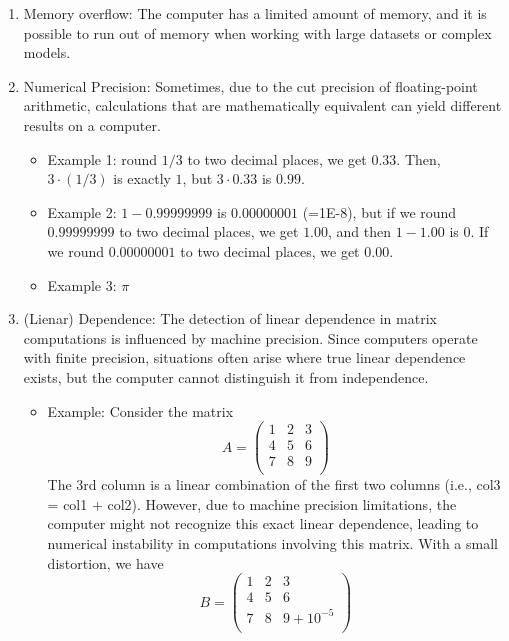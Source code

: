 \documentclass[
  letterpaper,
  DIV=11,
  numbers=noendperiod]{scrreprt}
\providecommand{\tightlist}{%
  \setlength{\itemsep}{0pt}\setlength{\parskip}{0pt}}
\begin{document}
\begin{enumerate}
\def\labelenumi{\arabic{enumi}.}
\item
  Memory overflow: The computer has a limited amount of memory, and it
  is possible to run out of memory when working with large datasets or
  complex models.
\item
  Numerical Precision: Sometimes, due to the cut precision of
  floating-point arithmetic, calculations that are mathematically
  equivalent can yield different results on a computer.

  \begin{itemize}
  \tightlist
  \item
    Example 1: round \(1/3\) to two decimal places, we get \(0.33\).
    Then, \(3 \cdot (1/3)\) is exactly \(1\), but \(3 \cdot 0.33\) is
    \(0.99\).
  \item
    Example 2: \(1 - 0.99999999\) is \(0.00000001\) (=1E-8), but if we
    round \(0.99999999\) to two decimal places, we get \(1.00\), and
    then \(1 - 1.00\) is \(0\). If we round \(0.00000001\) to two
    decimal places, we get \(0.00\).
  \item
    Example 3: \(\pi\)
  \end{itemize}
\item
  (Lienar) Dependence: The detection of linear dependence in matrix
  computations is influenced by machine precision. Since computers
  operate with finite precision, situations often arise where true
  linear dependence exists, but the computer cannot distinguish it from
  independence.

  \begin{itemize}
  \tightlist
  \item
    Example: Consider the matrix \[
     A = \begin{pmatrix}
     1 & 2 & 3 \\
     4 & 5 & 6 \\
     7 & 8 & 9 \\
     \end{pmatrix}
     \] The 3rd column is a linear combination of the first two columns
    (i.e., col3 = col1 + col2). However, due to machine precision
    limitations, the computer might not recognize this exact linear
    dependence, leading to numerical instability in computations
    involving this matrix. With a small distortion, we have \[
     B = \begin{pmatrix}
     1 & 2 & 3 \\
     4 & 5 & 6 \\
     7 & 8 & 9 + 10^{-5} \\
     \end{pmatrix}
     \]
  \end{itemize}
\end{enumerate}
\end{document}
